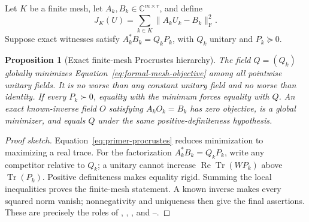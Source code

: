 \documentclass[11pt]{article}
\newtheorem{proposition}{Proposition}
\DeclareMathOperator{\Tr}{Tr}
\newcommand{\Frob}{\mathrm F}
\begin{document}
Let $K$ be a finite mesh, let $A_k,B_k\in\mathbb C^{m\times r}$, and define
\begin{equation}
 J_K(U)=\sum_{k\in K}\|A_kU_k-B_k\|_\Frob^2.
 \label{eq:formal-mesh-objective}
\end{equation}
Suppose exact witnesses satisfy
$A_k^*B_k=Q_kP_k$, with $Q_k$ unitary and $P_k\succeq0$.

\begin{proposition}[Exact finite-mesh Procrustes hierarchy]
The field $Q=(Q_k)$ globally minimizes Equation~\eqref{eq:formal-mesh-objective} among
all pointwise unitary fields. It is no worse than any constant unitary field and no worse
than identity. If every $P_k\succ0$, equality with the minimum forces equality with
$Q$. An exact known-inverse field $O$ satisfying $A_kO_k=B_k$ has zero objective, is a
global minimizer, and equals $Q$ under the same positive-definiteness hypothesis.
\end{proposition}

\begin{proof}[Proof sketch]
Equation~\eqref{eq:primer-procrustes} reduces minimization to maximizing a real trace.
For the factorization $A_k^*B_k=Q_kP_k$, write any competitor relative to $Q_k$; a
unitary cannot increase $\operatorname{Re}\Tr(WP_k)$ above $\Tr(P_k)$. Positive
definiteness makes equality rigid. Summing the local inequalities proves the finite-mesh
statement. A known inverse makes every squared norm vanish; nonnegativity and uniqueness
then give the final assertions. These are precisely the roles of
, ,
, and
--.
\end{proof}
\end{document}
